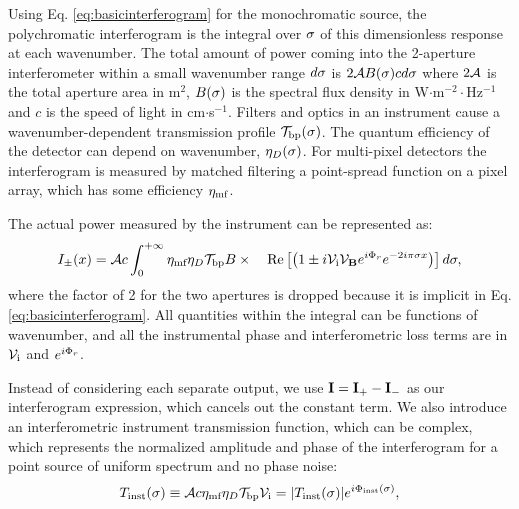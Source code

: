 Using Eq. \ref{eq:basicinterferogram} for the monochromatic source, the polychromatic interferogram is the integral over $\sigma$ of this dimensionless response at each wavenumber. The total amount of power coming into the 2-aperture interferometer within a small wavenumber range $d\sigma$ is $2\mathcal{A} B(\sigma) c d\sigma$ where $2\mathcal{A}$ is the total aperture area in m$^2$, $B(\sigma)$ is the spectral flux density in W$\cdot$m$^{-2}\cdot$Hz$^{-1}$ and $c$ is the speed of light in cm$\cdot$s$^{-1}$. 
Filters and optics in an instrument cause a wavenumber-dependent transmission profile $\mathcal{T}_\textrm{bp}(\sigma)$. The quantum efficiency of the detector can depend on wavenumber, $\eta_D(\sigma)$. For multi-pixel detectors the interferogram is measured by matched filtering a point-spread function on a pixel array, which has some efficiency $\eta_\textrm{mf}$.%


The actual power measured by the instrument can be represented as:
\begin{equation}
I_\pm(x) = \mathcal{A} c\int_0^{+\infty} \eta_\textrm{mf}\eta_D\mathcal{T}_\textrm{bp} B \times
 \quad  \textrm{Re} \left[\left(1\pm i \mathcal{V}_\textrm{i}\mathcal{V}_{\mathbf{B}} e^{i\Phi_r} e^{-2i\pi \sigma x}\right) \right]d\sigma,
\end{equation}
where the factor of 2 for the two apertures is dropped because it is implicit in Eq. \ref{eq:basicinterferogram}. All quantities within the integral can be functions of wavenumber, and all the instrumental phase and interferometric loss terms are in $\mathcal{V}_\textrm{i}$ and $e^{i\Phi_r}$.

Instead of considering each separate output, we use $\textrm{\textbf{I}} = \textrm{\textbf{I}}_+ - \textrm{\textbf{I}}_-$ as our interferogram expression, which cancels out the constant term. We also introduce an interferometric instrument transmission function, which can be complex, which represents the normalized amplitude and phase of the interferogram for a point source of uniform spectrum and no phase noise:
\begin{equation}
T_{\textrm{inst}}(\sigma) \equiv \mathcal{A} c\eta_\textrm{mf}\eta_D\mathcal{T}_\textrm{bp} \mathcal{V}_\textrm{i} = |T_{\textrm{inst}}(\sigma)|e^{i\Phi_{\textrm{inst}}(\sigma)},
\end{equation}

